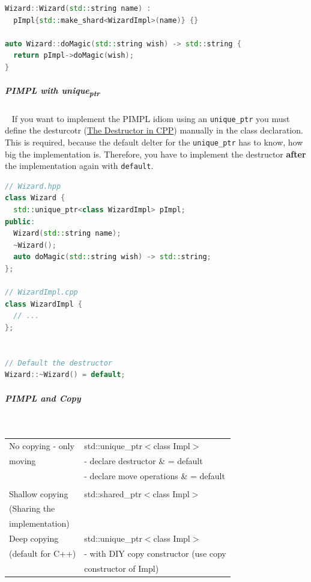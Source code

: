 \documentclass[11pt,twoside,landscape]{article}
\begin{document}
\begin{multicols}{2}
\begin{lstlisting}[language=c++,caption={PIMPL example using shared\textsubscript{ptr}},captionpos=b,numbers=none]
Wizard::Wizard(std::string name) :
  pImpl{std::make_shard<WizardImpl>(name)} {}

auto Wizard::doMagic(std::string wish) -> std::string {
  return pImpl->doMagic(wish);
}
\end{lstlisting}

\subparagraph{PIMPL with unique\textsubscript{ptr}} \
\label{sec:org7231674}
If you want to implement the PIMPL idiom using an \texttt{unique\_ptr} you must define the desturcotr (\href{../../../roam/20211119155746-the_destructor_in_cpp.org}{The Destructor in CPP}) manually in the class declaration.
This is required, because the default delter for the \texttt{unique\_ptr} has to know, how big the implementation is.
Therefore, you have to implement the destructor \textbf{after} the implementation again with \texttt{default}.

\begin{lstlisting}[language=c++,label=lst:pimpl-using-unique_ptr,caption={PIMPL using unique\textsubscript{ptr}},captionpos=b,numbers=none]
// Wizard.hpp
class Wizard {
  std::unique_ptr<class WizardImpl> pImpl;
public:
  Wizard(std::string name);
  ~Wizard();
  auto doMagic(std::string wish) -> std::string;
};

// WizardImpl.cpp
class WizardImpl {
  // ...
};


// Default the destructor
Wizard::~Wizard() = default;
\end{lstlisting}

\subparagraph{PIMPL and Copy} \
\label{sec:org020e109}
\begin{center}
\begin{tabular}{|l|l|}
\hline
No copying - only & std::unique\_ptr$<$class Impl$>$ \\
moving & - declare destructor \& = default \\
 & - declare move operations \& = default \\
 & \\
\hline
Shallow copying & std::shared\_ptr$<$class Impl$>$ \\
(Sharing the & \\
implementation) & \\
\hline
Deep copying & std::unique\_ptr$<$class Impl$>$ \\
(default for C++) & - with DIY copy constructor (use copy \\
 & constructor of Impl) \\
\hline
\end{tabular}
\end{center}


\end{multicols}
\end{document}

